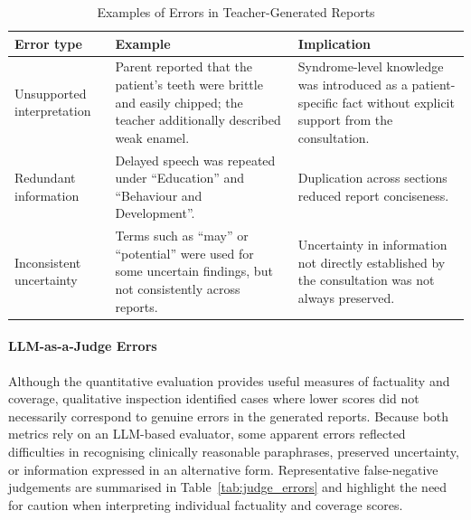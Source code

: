 \documentclass[ %
                    author={Aman Kumar Singh},
                supervisor={Dr. Edwin Simpson},
                    degree={MSc},
                     title={Quality-Aware Knowledge Distillation of Large Language Models for Efficient Personalised Clinical Report Generation},
                  subtitle={},
                      type={},
                      year={2021}]{dissertation}
\begin{document}
\vspace{-8pt}
\begin{table}[H]
\centering
\scriptsize
\caption{Examples of Errors in Teacher-Generated Reports}
\label{tab:teacher_errors}
\begin{tabular}{p{} p{} p{}}
\hline
\textbf{Error type} & \textbf{Example} & \textbf{Implication} \\
\hline

Unsupported interpretation
&
Parent reported that the patient's teeth were brittle and easily chipped;
the teacher additionally described weak enamel.
&
Syndrome-level knowledge was introduced as a patient-specific fact without
explicit support from the consultation.
\\

Redundant information
&
Delayed speech was repeated under ``Education'' and
``Behaviour and Development''.
&
Duplication across sections reduced report conciseness.
\\

Inconsistent uncertainty
&
Terms such as ``may'' or ``potential'' were used for some uncertain findings,
but not consistently across reports.
&
Uncertainty in information not directly established by the consultation was
not always preserved.
\\

\hline
\end{tabular}
\end{table}
\vspace{-8pt}
\paragraph{LLM-as-a-Judge Errors}

Although the quantitative evaluation provides useful measures of factuality and
coverage, qualitative inspection identified cases where lower scores did not
necessarily correspond to genuine errors in the generated reports. Because
both metrics rely on an LLM-based evaluator, some apparent errors reflected
difficulties in recognising clinically reasonable paraphrases, preserved
uncertainty, or information expressed in an alternative form. Representative
false-negative judgements are summarised in Table~\ref{tab:judge_errors} and
highlight the need for caution when interpreting individual factuality and
coverage scores.
\end{document}
